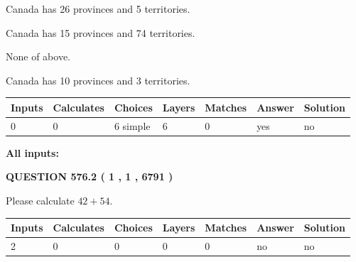 \documentclass[12pt]{article}
\begin{document}
 
Canada has  26 provinces and  5 territories.
 
 
Canada has  15 provinces and  74 territories.
 
 
 None of above.
 
 
\noindent{}
 
 
Canada has 10  provinces and 3 territories.
 
 
\noindent{}
 
 
   
   
   
   
\noindent\begin{tabular}{|l|l|l|l|l|l|l|}
 \hline
Inputs & Calculates & Choices & Layers & Matches & Answer & Solution \\ \hline
 0  & 
 0  & 
 6
  simple  
  & 
 6  & 
 0  & 
  yes & 
  no 
  \\ \hline
 \end{tabular}
   
   
   
   
\noindent{}
   
   
   
   
\noindent\vspace{0.1in}\hspace{-0.08in} {\textbf{\Large{All inputs: }}}
   
   
  
\vspace{0.2in}
  
{\textbf{\Large{QUESTION
576.2 
 ( 1 , 1 , 6791 )
}}}
  
  
 
Please calculate $ %
42 +  %
54 $.
 
 
   
   
   
   
\noindent\begin{tabular}{|l|l|l|l|l|l|l|}
 \hline
Inputs & Calculates & Choices & Layers & Matches & Answer & Solution \\ \hline
 2  & 
 0  & 
 0
  & 
 0  & 
 0  & 
  no & 
  no 
  \\ \hline
 \end{tabular}
   
\end{document}
